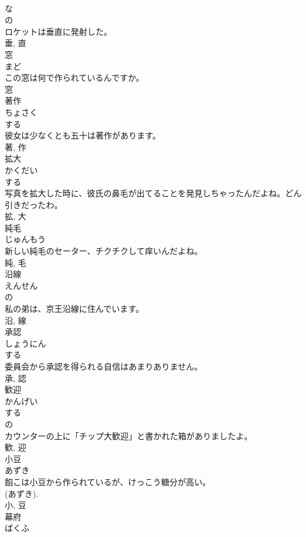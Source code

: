 \documentclass[8pt]{extreport}
\begin{document}
\begin{CJK}{UTF8}{min}
\\	な 
\\	の 
\\	ロケットは垂直に発射した。	
\\	垂, 直	
\\	窓	
\\	まど	
\\	この窓は何で作られているんですか。	
\\	窓	
\\	著作	
\\	ちょさく	
\\	する 
\\	彼女は少なくとも五十は著作があります。	
\\	著, 作	
\\	拡大	
\\	かくだい	
\\	する 
\\	写真を拡大した時に、彼氏の鼻毛が出てることを発見しちゃったんだよね。どん引きだったわ。	
\\	拡, 大	
\\	純毛	
\\	じゅんもう	
\\	新しい純毛のセーター、チクチクして痒いんだよね。	
\\	純, 毛	
\\	沿線	
\\	えんせん	
\\	の 
\\	私の弟は、京王沿線に住んでいます。	
\\	沿, 線	
\\	承認	
\\	しょうにん	
\\	する 
\\	委員会から承認を得られる自信はあまりありません。	
\\	承, 認	
\\	歓迎	
\\	かんげい	
\\	する 
\\	の 
\\	カウンターの上に「チップ大歓迎」と書かれた箱がありましたよ。	
\\	歓, 迎	
\\	小豆	
\\	あずき	
\\	餡こは小豆から作られているが、けっこう糖分が高い。	
\\	(あずき). 
\\	小, 豆	
\\	幕府	
\\	ばくふ	

\end{CJK}
\end{document}
